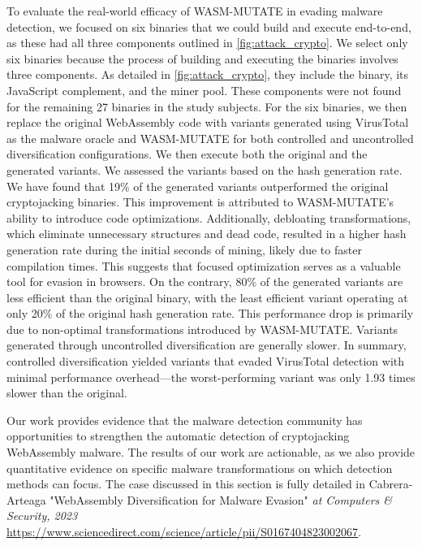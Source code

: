  To evaluate the real-world efficacy of WASM-MUTATE in evading malware detection, we focused on six binaries that we could build and execute end-to-end, as these had all three components outlined in \autoref{fig:attack_crypto}. 
We select only six binaries because the process of building and executing the binaries involves three components. 
As detailed in \autoref{fig:attack_crypto}, they include the \Was binary, its JavaScript complement, and the miner pool. 
These components were not found for the remaining 27 binaries in the study subjects.
For the six binaries, we then replace the original WebAssembly code with variants generated using VirusTotal as the malware oracle and WASM-MUTATE for both controlled and uncontrolled diversification configurations. 
We then execute both the original and the generated variants. 
We assessed the variants based on the hash generation rate.
We have found that 19\% of the generated variants outperformed the original cryptojacking binaries. 
This improvement is attributed to WASM-MUTATE's ability to introduce code optimizations. 
Additionally, debloating transformations, which eliminate unnecessary structures and dead code, resulted in a higher hash generation rate during the initial seconds of mining, likely due to faster compilation times. 
This suggests that focused optimization serves as a valuable tool for evasion in browsers.
On the contrary, 80\% of the generated variants are less efficient than the original binary, with the least efficient variant operating at only 20\% of the original hash generation rate. 
This performance drop is primarily due to non-optimal transformations introduced by WASM-MUTATE. 
Variants generated through uncontrolled diversification are generally slower.
In summary, controlled diversification yielded variants that evaded VirusTotal detection with minimal performance overhead—the worst-performing variant was only 1.93 times slower than the original.


\begin{tcolorbox}[title=Contribution paper,boxrule=1pt,arc=.2em,boxsep=1.0mm]
    Our work provides evidence that the malware detection community has opportunities to strengthen the automatic detection of cryptojacking WebAssembly malware. 
    The results of our work are actionable, as we also provide quantitative evidence on specific malware transformations on which detection methods can focus. 
    The case discussed in this section is fully detailed in Cabrera-Arteaga \etal "WebAssembly Diversification for Malware Evasion"
    \emph{at Computers \& Security, 2023}
    \url{https://www.sciencedirect.com/science/article/pii/S0167404823002067}. 
\end{tcolorbox}
